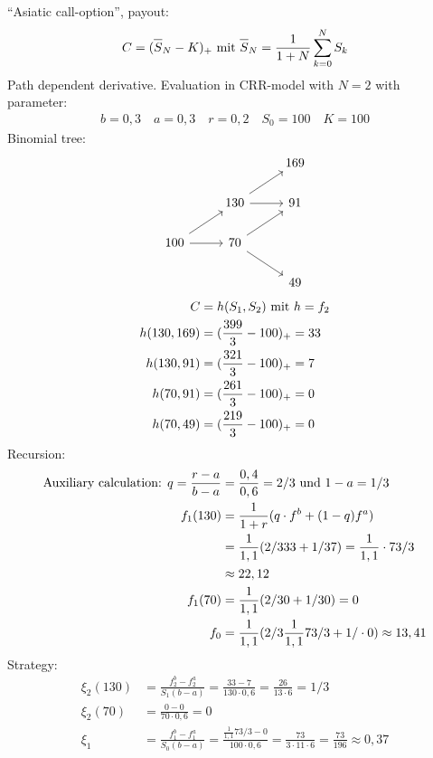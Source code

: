 \begin{*example}
	``Asiatic call-option'', payout:
	\begin{align*}
		C=(\overline{S}_N - K)_+ \mit \overline{S}_N = \frac{1}{1+N}\sum_{k=0}^N S_k
	\end{align*}
	Path dependent derivative. Evaluation in CRR-model with $N=2$ with parameter:
	\begin{align*}
		b=0,3\quad a=0,3 \quad r = 0,2\quad S_0 = 100\quad K = 100
	\end{align*}
	Binomial tree:
	\[
		\begin{tikzcd}
			&                          & 169 \\
			& 130 \arrow[ru] \arrow[r] & 91  \\
			100 \arrow[ru] \arrow[r] & 70 \arrow[ru] \arrow[rd] &     \\
			&                          & 49 
		\end{tikzcd}
	\]
	\begin{align*}
		C&=h(S_1,S_2) \mit h = f_2\\
		h(130,169) &= (\frac{399}{3}-100)_+ = 33\\
		h(130,91) &= (\frac{321}{3}-100)_+ = 7\\
		h(70,91) &= (\frac{261}{3}-100)_+ = 0\\
		h(70,49) &= (\frac{219}{3}-100)_+ = 0
	\end{align*}
	Recursion:\\
	\begin{align*}
		\text{Auxiliary calculation: }q = \frac{r-a}{b-a} &= \frac{0,4}{0,6} = 2/3 \und 1-a = 1/3\\
		f_1(130) &= \frac{1}{1+r}(q \cdot f^b + (1-q)f^a)\\
		&= \frac{1}{1,1}(2/3 33 + 1/3 7) = \frac{1}{1,1}\cdot 73/3\\
		&\approx 22,12\\
		f_1(70) &= \frac{1}{1,1}(2/3 0 + 1/3 0) = 0\\
		f_0 &= \frac{1}{1,1}(2/3 \frac{1}{1,1} 73/3 + 1/\cdot 0) \approx 13,41
	\end{align*}
	Strategy:
	\begin{align*}
		\xi_2(130) &= \frac{f_2^b - f_2^a}{S_1 (b-a)} = \frac{33-7}{130\cdot 0,6} = \frac{26}{13\cdot 6} = 1/3\\
		\xi_2(70) &= \frac{0-0}{70\cdot 0,6} = 0\\
		\xi_1 &= \frac{f_1^b - f_1^a}{S_0(b-a)} = \frac{\frac{1}{1,1}73/3 - 0}{100\cdot 0,6} = \frac{73}{3\cdot 11 \cdot 6} = \frac{73}{196} \approx 0,37 
	\end{align*}
\end{*example}
